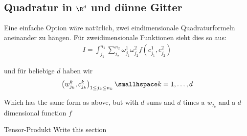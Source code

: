 \newsection
\subsection{Quadratur in $\R^d$ und dünne Gitter}
Eine einfache Option wäre natürlich, zwei eindimensionale Quadraturformeln aneinander zu hängen.
Für zweidimensionale Funktionen sieht dies so aus:
\rmvspace
\begin{align*}
    I = \int_{j_1}^{n_1} \sum_{j_2}^{n_2} \omega_{j_1}^1 \omega_{j_2}^2 f(c_{j_1}^1, c_{j_2}^2)
\end{align*}

\drmvspace
und für beliebige $d$ haben wir
\rmvspace
\begin{align*}
    \left( w_{j_k}^k, c_{j_k}^k \right)_{1 \leq j_k \leq n_k} \smallhspace k = 1, \ldots, d
\end{align*}

\drmvspace
Which has the same form as above, but with $d$ sums and $d$ times a $w_{j_k}$ and a $d$-dimensional function $f$


\begin{recall}[]{Tensor-Produkt}
    \TODO Write this section
\end{recall}
